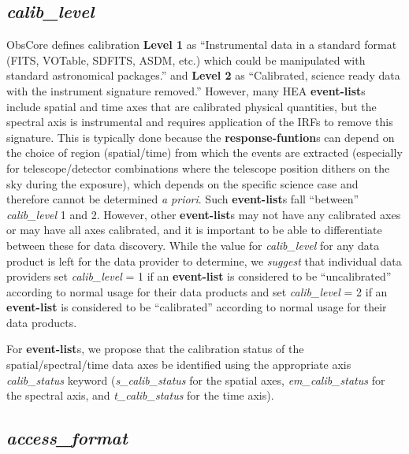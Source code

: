 \documentclass[11pt,a4paper]{ivoa}
\begin{document}
\subsection{{\em calib\_level}}

ObsCore defines calibration {\bf Level 1} as ``Instrumental data in a standard format (FITS, VOTable, SDFITS, ASDM, etc.) which could be manipulated with standard astronomical packages.'' and {\bf Level 2} as ``Calibrated, science ready data with the instrument signature removed.''  However, many HEA {\bf event-list}s include spatial and time axes that are calibrated physical quantities, but the spectral axis is instrumental and requires application of the IRFs to remove this signature.  This is typically done because the {\bf response-funtion}s can depend on the choice of region (spatial/time) from which the events are extracted (especially for telescope/detector combinations where the telescope position dithers on the sky during the exposure), which depends on the specific science case and therefore cannot be determined {\em a priori\/}.  Such {\bf event-list}s fall ``between'' {\em calib\_level\/} 1 and 2.  However, other {\bf event-list}s may not have any calibrated axes or may have all axes calibrated, and it is important to be able to differentiate between these for data discovery.  While the value for {\em calib\_level\/} for any data product is left for the data provider to determine, we {\em suggest\/} that individual data providers set {\em calib\_level\/} = 1 if an {\bf event-list} is considered to be ``uncalibrated'' according to normal usage for their data products and set {\em calib\_level\/} = 2 if an {\bf event-list} is considered to be ``calibrated'' according to normal usage for their data products.

For {\bf event-list}s, we propose that the calibration status of the spatial/spectral/time data axes be identified using the appropriate axis {\em calib\_status\/} keyword ({\em s\_calib\_status\/} for the spatial axes, {\em em\_calib\_status\/} for the spectral axis, and {\em t\_calib\_status\/} for the time axis).


\subsection{{\em access\_format}}
\end{document}
